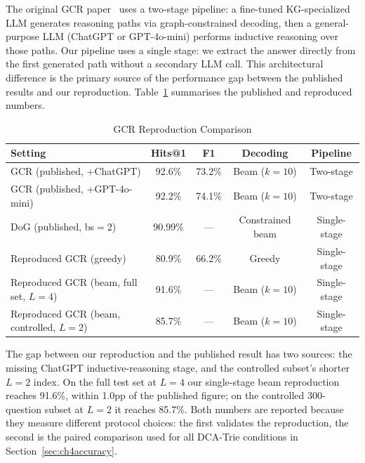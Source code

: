 The original GCR paper~\citep{luo2025-graph-constrained-reasoning} uses a two-stage pipeline: a fine-tuned KG-specialized LLM generates reasoning paths via graph-constrained decoding, then a general-purpose LLM (ChatGPT or GPT-4o-mini) performs inductive reasoning over those paths. Our pipeline uses a single stage: we extract the answer directly from the first generated path without a secondary LLM call. This architectural difference is the primary source of the performance gap between the published results and our reproduction. Table~\ref{tab:repro} summarises the published and reproduced numbers.

\begin{table}[H]
  \centering
  \caption[GCR Reproduction Comparison]{GCR Reproduction Comparison}
  \label{tab:repro}
  \begin{tabularx}{\textwidth}{|X|c|c|c|c|}
    \hline
    \textbf{Setting}              & \textbf{Hits@1} & \textbf{F1} & \textbf{Decoding} & \textbf{Pipeline} \\
    \hline
    GCR (published, +ChatGPT)     & 92.6\%          & 73.2\%      & Beam ($k{=}10$)   & Two-stage         \\
    \hline
    GCR (published, +GPT-4o-mini) & 92.2\%          & 74.1\%      & Beam ($k{=}10$)   & Two-stage         \\
    \hline
    DoG (published, bs$=2$)       & 90.99\%         & ---          & Constrained beam  & Single-stage      \\
    \hline
    Reproduced GCR (greedy)       & 80.9\%          & 66.2\%      & Greedy            & Single-stage      \\
    \hline
    Reproduced GCR (beam, full set, $L{=}4$) & 91.6\% & ---   & Beam ($k{=}10$)   & Single-stage      \\
    \hline
    Reproduced GCR (beam, controlled, $L{=}2$) & 85.7\% & --- & Beam ($k{=}10$)  & Single-stage      \\
    \hline
  \end{tabularx}
\end{table}

The gap between our reproduction and the published result has two sources: the missing ChatGPT inductive-reasoning stage, and the controlled subset's shorter $L{=}2$ index. On the full test set at $L{=}4$ our single-stage beam reproduction reaches 91.6\%, within 1.0pp of the published figure; on the controlled 300-question subset at $L{=}2$ it reaches 85.7\%. Both numbers are reported because they measure different protocol choices: the first validates the reproduction, the second is the paired comparison used for all DCA-Trie conditions in Section~\ref{sec:ch4accuracy}.

